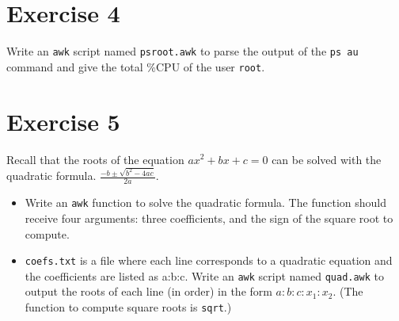    \section {Exercise 4}
      Write an \verb;awk; script named \verb;psroot.awk; to parse the output of the \verb;ps au; command and give the total \%CPU of the user \verb;root;. \n


   \section {Exercise 5}
                Recall that the roots of the equation $ax^{2} +bx+c = 0$ can be solved with the quadratic formula.
                \centering$\frac{-b\pm\sqrt{b^{2}-4ac}}{2a}$.

                \begin{itemize}
                        \item Write an \verb;awk; function to solve the quadratic formula. The function should receive four arguments: three coefficients, and the sign of the square root to compute.\n

                        \item  \verb;coefs.txt; is a file where each line corresponds to a quadratic equation and the coefficients are listed as a:b:c. Write an \verb;awk; script named \verb;quad.awk; to output the roots of each line (in order) in the form $a : b : c : x_{1} : x_{2}$.  (The function to compute square roots is \verb;sqrt;.)\n


                \end{itemize}



